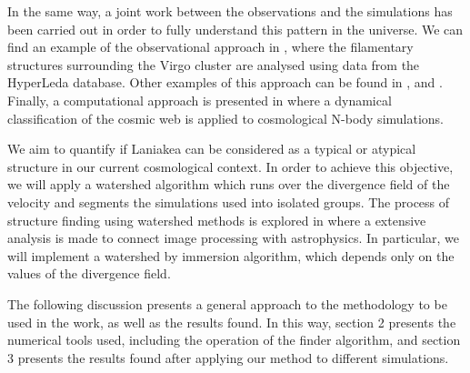 \documentclass[usenatbib]{mnras}
\begin{document}
In the same way, a joint work between the
observations and the simulations has been carried out in order to
fully understand this pattern in the universe. We can find an example
of the observational approach in \cite{Kim_2016}, where the
filamentary structures surrounding the Virgo cluster are analysed
using data from the HyperLeda database. 
Other examples of this
approach can be found in \cite{Santiago_Bautista_2020},
\cite{van_de_Weygaert_2014} and \cite{Lares_2017}. Finally, a
computational approach is presented in
\cite{10.1111/j.1365-2966.2009.14885.x} where a dynamical
classification of the cosmic web is applied to cosmological N-body
simulations.  

We aim to quantify if Laniakea can be considered as a typical or atypical 
structure in our current cosmological context. In order to achieve
this objective, we will apply a watershed algorithm
\citep{BeucherWatershed1979} which runs over the divergence field of
the velocity and segments the simulations used into isolated
groups. The process of structure finding using watershed methods is
explored in \cite{10.1111/j.1365-2966.2007.12125.x} where a extensive
analysis is made to connect image processing with astrophysics. In
particular, we will implement a watershed by immersion algorithm,
which depends only on the values of the divergence field.  

The following discussion presents a general approach to the
methodology to be used in the work, as well as the results found. In
this way, section 2 presents the numerical tools used, including the
operation of the finder algorithm, and section 3 presents the results
found after applying our method to different simulations. 
\end{document}
